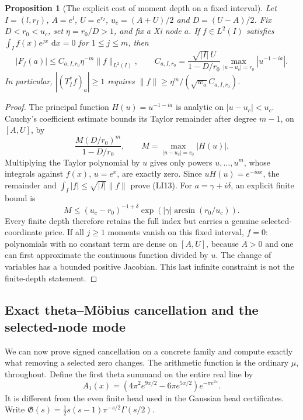 \documentclass[11pt]{article}
\newtheorem{proposition}[theorem]{Proposition}
\theoremstyle{remark}\newtheorem{remark}[theorem]{Remark}
\newcommand{\dd}{\,\mathrm d}
\begin{document}
\begin{proposition}[The explicit cost of moment depth on a fixed interval]
\label{prop:local-moment-price}
Let \(I=(l,r_I)\), \(A=e^l\), \(U=e^{r_I}\),
\(u_c=(A+U)/2\) and \(D=(U-A)/2\).
Fix \(D<r_0<u_c\), set \(\eta=r_0/D>1\), and fix a Xi node \(a\).
If \(f\in L^2(I)\) satisfies
\(\int_I f(x)e^{jx}\,\dd x=0\) for \(1\le j\le m\), then
\[
 |F_f(a)|\le C_{a,I,r_0}\eta^{-m}\|f\|_{L^2(I)},\qquad
 C_{a,I,r_0}
   =\frac{\sqrt{|I|}\,U}{1-D/r_0}
                \max_{|u-u_c|=r_0}|u^{-1-ia}|.
 \tag{LI13}
\]
In particular, \(|(T_I^*f)_a|\ge1\) requires
\(\|f\|\ge\eta^m/(\sqrt{w_a}C_{a,I,r_0})\).
\end{proposition}
\begin{proof}
The principal function \(H(u)=u^{-1-ia}\) is analytic on
\(|u-u_c|<u_c\). Cauchy's coefficient estimate bounds its Taylor
remainder after degree \(m-1\), on \([A,U]\), by
\[
 \frac{M(D/r_0)^m}{1-D/r_0},
 \qquad M=\max_{|u-u_c|=r_0}|H(u)|.
\]
Multiplying the Taylor polynomial by \(u\) gives only powers
\(u,\ldots,u^m\), whose integrals against \(f(x)\), \(u=e^x\),
are exactly zero. Since \(uH(u)=e^{-iax}\), the remainder and
\(\int_I|f|\le\sqrt{|I|}\|f\|\) prove (LI13).
For \(a=\gamma+i\delta\), an explicit finite bound is
\[
 M\le (u_c-r_0)^{-1+\delta}
          \exp\!\left(|\gamma|\arcsin(r_0/u_c)\right).
 \tag{LI14}
\]
Every finite depth therefore retains the full index but carries
a genuine selected-coordinate price. If all \(j\ge1\) moments
vanish on this fixed interval, \(f=0\): polynomials with no
constant term are dense on \([A,U]\), because \(A>0\) and one
can first approximate the continuous function divided by \(u\).
The change of variables has a bounded positive Jacobian. This
last infinite constraint is not the finite-depth statement.
\end{proof}

\subsection{Exact theta--M\"obius cancellation and the selected-node mode}
\label{sec:theta-mobius-mode}

We can now prove signed cancellation on a concrete family and
compute exactly what removing a selected zero changes.
The arithmetic function is the ordinary \(\mu\), throughout.
Define the first theta summand on the entire real line by
\[
 A_1(x)=(4\pi^2e^{9x/2}-6\pi e^{5x/2})e^{-\pi e^{2x}} .
                                                               \tag{TMO1}
\]
It is different from the even finite head used in the Gaussian
head certificates. Write
\(\mathfrak G(s)=\tfrac12s(s-1)\pi^{-s/2}\Gamma(s/2)\).
\end{document}
